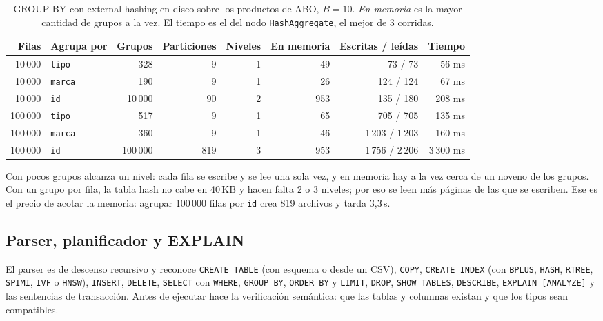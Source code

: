 \documentclass[11pt,a4paper]{article}
\begin{document}
\begin{table}[H]
\centering
\small
\begin{tabular}{rlrrrrrr}
\toprule
Filas & Agrupa por & Grupos & Particiones & Niveles & En memoria & Escritas / leídas & Tiempo \\
\midrule
10\,000 & \texttt{tipo} & 328 & 9 & 1 & 49 & 73 / 73 & 56 ms \\
10\,000 & \texttt{marca} & 190 & 9 & 1 & 26 & 124 / 124 & 67 ms \\
10\,000 & \texttt{id} & 10\,000 & 90 & 2 & 953 & 135 / 180 & 208 ms \\
100\,000 & \texttt{tipo} & 517 & 9 & 1 & 65 & 705 / 705 & 135 ms \\
100\,000 & \texttt{marca} & 360 & 9 & 1 & 46 & 1\,203 / 1\,203 & 160 ms \\
100\,000 & \texttt{id} & 100\,000 & 819 & 3 & 953 & 1\,756 / 2\,206 & 3\,300 ms \\
\bottomrule
\end{tabular}
\caption{GROUP BY con external hashing en disco sobre los productos de ABO, $B = 10$. \emph{En memoria} es la mayor cantidad de grupos a la vez. El tiempo es el del nodo \texttt{HashAggregate}, el mejor de 3 corridas.}
\label{tab:hash-externo}
\end{table}

Con pocos grupos alcanza un nivel: cada fila se escribe y se lee una sola vez, y en memoria hay a la vez cerca de un noveno de los grupos. Con un grupo por fila, la tabla hash no cabe en 40\,KB y hacen falta 2 o 3 niveles; por eso se leen más páginas de las que se escriben. Ese es el precio de acotar la memoria: agrupar 100\,000 filas por \texttt{id} crea 819 archivos y tarda 3,3\,s.

\subsection{Parser, planificador y EXPLAIN}

El parser es de descenso recursivo y reconoce \texttt{CREATE TABLE} (con esquema o desde un CSV), \texttt{COPY}, \texttt{CREATE INDEX} (con \texttt{BPLUS}, \texttt{HASH}, \texttt{RTREE}, \texttt{SPIMI}, \texttt{IVF} o \texttt{HNSW}), \texttt{INSERT}, \texttt{DELETE}, \texttt{SELECT} con \texttt{WHERE}, \texttt{GROUP BY}, \texttt{ORDER BY} y \texttt{LIMIT}, \texttt{DROP}, \texttt{SHOW TABLES}, \texttt{DESCRIBE}, \texttt{EXPLAIN [ANALYZE]} y las sentencias de transacción. Antes de ejecutar hace la verificación semántica: que las tablas y columnas existan y que los tipos sean compatibles.
\end{document}

